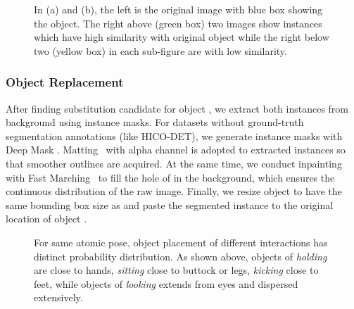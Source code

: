 \documentclass[10pt,twocolumn,letterpaper]{article}
\begin{document}
\begin{figure}[tb!]
\centering
{}
\caption{In (a) and (b), the left is the original image with blue box showing the object. The right above (green box) two images show instances which have high similarity with original object while the right below two (yellow box) in each sub-figure are with low similarity.}
\label{fig:object similarity}
\end{figure}

\subsubsection{Object Replacement}
After finding substitution candidate  for object , we extract both instances from background using instance masks. For datasets without ground-truth segmentation annotations (like HICO-DET), we generate instance masks with Deep Mask \cite{DBLP:journals/corr/PinheiroCD15}. Matting~\cite{he2011global} with alpha channel is adopted to extracted instances so that smoother outlines are acquired. At the same time, we conduct inpainting with Fast Marching~\cite{bertalmio2001navier} to fill the hole of  in the background, which ensures the continuous distribution of the raw image. Finally, we resize object  to have the same bounding box size as  and paste the segmented instance  to the original location of object .

\begin{figure}[tb!]
\centering
{}

\caption{For same atomic pose, object placement of different interactions has distinct probability distribution. As shown above, objects of \textit{holding} are close to hands, \textit{sitting} close to buttock or legs, \textit{kicking} close to feet, while objects of \textit{looking} extends from eyes and dispersed extensively.}
\label{fig:person map}
\end{figure}
\end{document}

